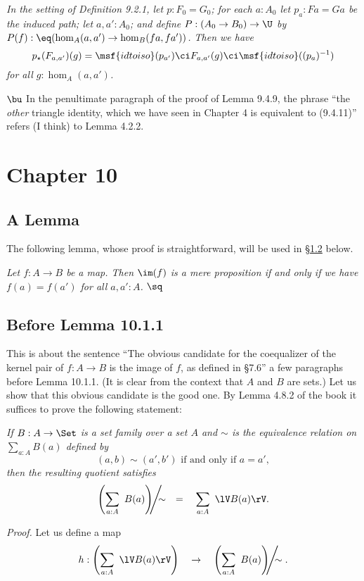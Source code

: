 \documentclass[12pt]{article}
\begin{document}
\emph{In the setting of Definition 9.2.1, let $p:F_0=G_0$; for each $a:A_0$ let $p_a:Fa=Ga$ be the induced path; let $a,a':A_0$; and define $P:(A_0\to B_0)\to\U$ by $P(f):\eq(\hom_A(a,a')\to\hom_B(fa,fa'))$. Then we have} 
$$
p_\star(F_{a,a'})(g)=\msf{idtoiso}(p_{a'})\ci F_{a,a'}(g)\ci\msf{idtoiso}((p_a)^{-1})
$$ 
\emph{for all $g:\hom_A(a,a')$.}

\nn$\bu$ In the penultimate paragraph of the proof of Lemma 9.4.9, the phrase ``the \emph{other} triangle identity, which we have seen in Chapter 4 is equivalent to (9.4.11)'' refers (I think) to Lemma 4.2.2.


\section{Chapter 10}\label{imfmp}

\subsection{A Lemma}

The following lemma, whose proof is straightforward, will be used in \S\ref{1011} below.

 \emph{Let $f:A\to B$ be a map. Then $\im(f)$ is a mere proposition if and only if we have $f(a)=f(a')$ for all $a,a':A$.} $\sq$


\subsection{Before Lemma 10.1.1}\label{1011}

This is about the sentence ``The obvious candidate for the coequalizer of the kernel pair of $f:A\to B$ is the image of $f$, as defined in \S7.6'' a few paragraphs before Lemma 10.1.1. (It is clear from the context that $A$ and $B$ are sets.) Let us show that this obvious candidate is the good one. By Lemma 4.8.2 of the book it suffices to prove the following statement:

\emph{If $B:A\to\Set$ is a set family over a set $A$ and $\sim$ is the equivalence relation on $\sum_{a:A}B(a)$ defined by 
$$
(a,b)\sim(a',b')\text{ if and only if }a=a',
$$ 
then the resulting quotient satisfies}
$$
\left(\sum_{a:A}\ B(a)\right)\!\!\!\Bigg/\!\!\!\!\sim\quad=\quad\sum_{a:A}\ \lV B(a)\rV.
$$

\nn\emph{Proof.} Let us define a map 
$$
h:\left(\sum_{a:A}\ \lV B(a)\rV\right)\quad\to\quad\left(\sum_{a:A}\ B(a)\right)\!\!\!\Bigg/\!\!\!\!\sim.
$$ 
\end{document}
